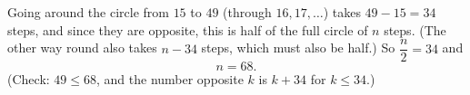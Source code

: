 Going around the circle from $15$ to $49$ (through $16,17,\dots$) takes $49-15=34$ steps, and since they are opposite, this is half of the full circle of $n$ steps. (The other way round also takes $n-34$ steps, which must also be half.) So $\dfrac{n}{2}=34$ and
\[
n=\boxed{68}.
\]
(Check: $49\le68$, and the number opposite $k$ is $k+34$ for $k\le34$.)
